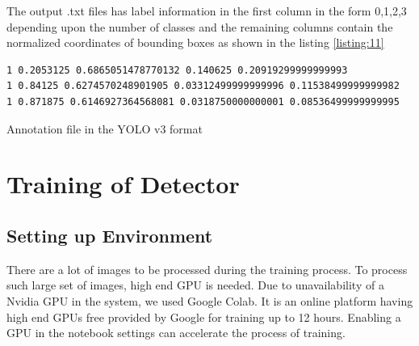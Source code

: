 The output .txt files has label information in the first column in the form 0,1,2,3 depending upon the number of classes and the remaining columns contain the normalized coordinates of bounding boxes as shown in the listing \ref{listing:11}

\begin{longlisting}
\begin{verbatim}
1 0.2053125 0.6865051478770132 0.140625 0.20919299999999993
1 0.84125 0.6274570248901905 0.03312499999999996 0.11538499999999982
1 0.871875 0.6146927364568081 0.0318750000000001 0.08536499999999995
\end{verbatim}
\caption{Annotation file in the YOLO v3 format}
\label{listing:11}
\end{longlisting}

\section{Training of Detector}
\subsection{Setting up Environment}
There are a lot of images to be processed during the training process. To process such large set of  images, high end GPU is needed. Due to unavailability of a Nvidia GPU in the system, we used Google Colab. It is an  online platform having high end GPUs free provided by Google for training up to 12 hours. Enabling a GPU in the notebook settings can accelerate the process of training. 

